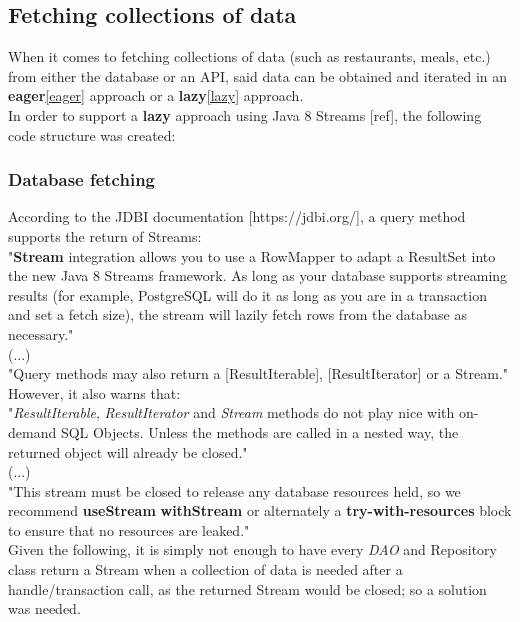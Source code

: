 \subsection{Fetching collections of data}
When it comes to fetching collections of data (such as restaurants, meals, etc.) from either the database or an API, said data can be obtained
and iterated in an \textbf{eager}\ref{eager} approach or a \textbf{lazy}\ref{lazy} approach.\\

In order to support a \textbf{lazy} approach using Java 8 Streams [ref], the following code structure was created:

\subsubsection{Database fetching}

According to the JDBI documentation [https://jdbi.org/], a query method supports the return of Streams:\\

"\textbf{Stream} integration allows you to use a RowMapper to adapt a ResultSet into the new Java 8 Streams framework.
As long as your database supports streaming results (for example, PostgreSQL will do it as long as you are in a transaction and set a fetch size),
the stream will lazily fetch rows from the database as necessary."\\

(...)\\

"Query methods may also return a [ResultIterable], [ResultIterator] or a Stream."\\

However, it also warns that:\\

"\textit{ResultIterable}, \textit{ResultIterator} and \textit{Stream} methods do not play nice with on-demand SQL Objects.
Unless the methods are called in a nested way, the returned object will already be closed."\\

(...)\\

"This stream must be closed to release any database resources held, so we recommend \textbf{useStream} \textbf{withStream}
or alternately a \textbf{try-with-resources} block to ensure that no resources are leaked."\\

Given the following, it is simply not enough to have every \textit{DAO} and Repository class return a Stream when a collection
of data is needed after a handle/transaction call, as the returned Stream would be closed; so a solution was needed.\\

